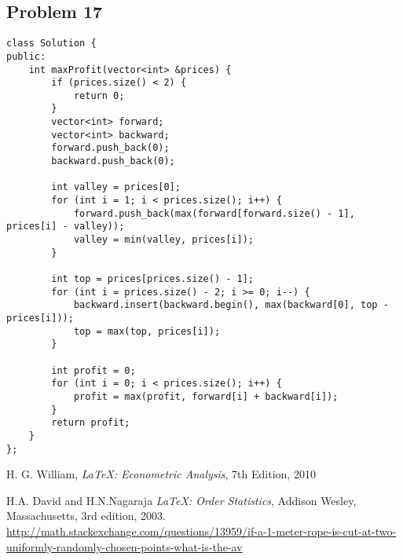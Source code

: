 \documentclass[11pt]{article}
\theoremstyle{remark}
\begin{document}
\subsection{Problem 17}
\begin{lstlisting}
class Solution {
public:
    int maxProfit(vector<int> &prices) {
        if (prices.size() < 2) {
            return 0;
        }
        vector<int> forward;
        vector<int> backward;
        forward.push_back(0);
        backward.push_back(0);
        
        int valley = prices[0];
        for (int i = 1; i < prices.size(); i++) {
            forward.push_back(max(forward[forward.size() - 1], prices[i] - valley));
            valley = min(valley, prices[i]);
        }
        
        int top = prices[prices.size() - 1];
        for (int i = prices.size() - 2; i >= 0; i--) {
            backward.insert(backward.begin(), max(backward[0], top - prices[i]));
            top = max(top, prices[i]);
        }
        
        int profit = 0;
        for (int i = 0; i < prices.size(); i++) {
            profit = max(profit, forward[i] + backward[i]);
        }
        return profit;
    }
};
\end{lstlisting}

\begin{thebibliography}{9}

H. G. William, \emph{\LaTeX: Econometric Analysis}, 7th Edition, 2010

  H.A. David and H.N.Nagaraja
  \emph{\LaTeX: Order Statistics},
  Addison Wesley, Massachusetts,
  3rd edition,
  2003.
 \url{http://math.stackexchange.com/questions/13959/if-a-1-meter-rope-is-cut-at-two-uniformly-randomly-chosen-points-what-is-the-av}

\end{thebibliography}
\end{document}
